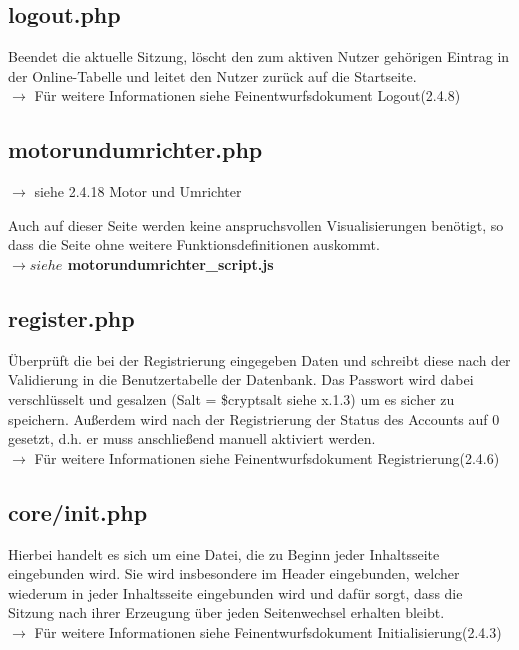 \documentclass[fontsize = 12pt, paper = a4]{scrreprt}
\begin{document}
\subsection{logout.php}
Beendet die aktuelle Sitzung, löscht den zum aktiven Nutzer gehörigen Eintrag in der Online-Tabelle und leitet den Nutzer zurück auf die Startseite.\\
$\rightarrow$ Für weitere Informationen siehe Feinentwurfsdokument \glqq Logout\grqq (2.4.8)

\subsection{motorundumrichter.php}
$\rightarrow$ siehe 2.4.18 Motor und Umrichter

Auch auf dieser Seite werden keine anspruchsvollen Visualisierungen benötigt, so dass die Seite ohne weitere Funktionsdefinitionen auskommt.\\

\textbf{$\rightarrow siehe$ motorundumrichter\_script.js}\\

\subsection{register.php}
Überprüft die bei der Registrierung eingegeben Daten und schreibt diese nach der Validierung in die Benutzertabelle der Datenbank. Das Passwort wird dabei verschlüsselt und gesalzen (Salt = \$cryptsalt siehe x.1.3) um es sicher zu speichern. Außerdem wird nach der Registrierung der Status des Accounts auf 0 gesetzt, d.h. er muss anschließend manuell aktiviert werden.\\
$\rightarrow$ Für weitere Informationen siehe Feinentwurfsdokument \glqq Registrierung\grqq (2.4.6)

\subsection{core/init.php}
Hierbei handelt es sich um eine Datei, die zu Beginn jeder Inhaltsseite eingebunden wird. Sie wird insbesondere im Header eingebunden, welcher wiederum in jeder Inhaltsseite eingebunden wird und dafür sorgt, dass die Sitzung nach ihrer Erzeugung über jeden Seitenwechsel erhalten bleibt.\\
$\rightarrow$ Für weitere Informationen siehe Feinentwurfsdokument \glqq Initialisierung\grqq (2.4.3)
\end{document}
